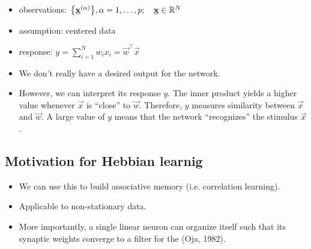 \begin{frame}{\secname}

\begin{itemize}
\item[] observations: $\big\{ \underline{\mathbf{x}}^{(\alpha)} \big\}, \alpha = 1, \ldots, p; \quad \underline{\mathbf{x}} \in \mathbb{R}^N$\\

\item[] assumption: centered data\\

\item[] response: $y = \sum_{i=1}^{N} w_i x_i = \vec w^{\top} \vec x$\\

\item[] We don't really have a desired output for the network.\\
\item[] However, we can interpret its response $y$.
The inner product yields a higher value whenever $\vec x$ is ``close'' to $\vec w$.
Therefore, $y$ measures similarity between $\vec x$ and $\vec w$.
A large value of $y$ means that the network ``recognizes'' the stimulus $\vec x$.
\end{itemize}

\end{frame}

\newpage

\subsection{Motivation for Hebbian learnig}

\begin{frame}{\subsecname}

\begin{itemize}
\item We can use this to build associative memory (i.e. correlation learning).
\item Applicable to non-stationary data.
\item More importantly, a single linear neuron 
can organize itself such that its synaptic weights converge to a filter 
for the  (Oja, 1982).

\pause


\end{itemize}

\end{frame}


